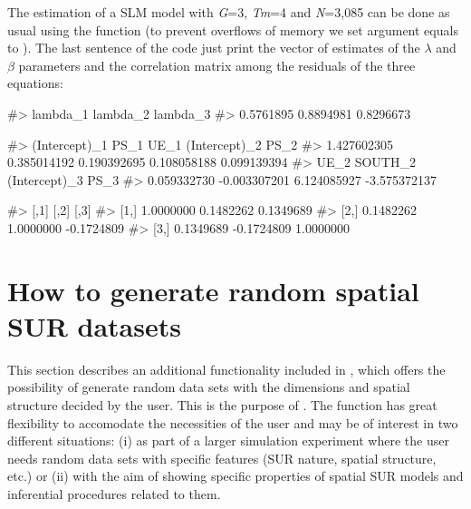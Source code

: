 \documentclass[article]{jss}
\begin{document}
The estimation of a SLM model with \emph{G}=3, \emph{Tm}=4 and \emph{N}=3,085 can be done as usual using the  function (to prevent overflows of memory we set  argument equals to ). The last sentence of the code just print the vector of estimates of the \(\lambda\) and \(\beta\) parameters and the correlation matrix among the residuals of the three equations:

\begin{CodeChunk}


\begin{CodeOutput}
#>  lambda_1  lambda_2  lambda_3 
#> 0.5761895 0.8894981 0.8296673
\end{CodeOutput}

\begin{CodeOutput}
#> (Intercept)_1          PS_1          UE_1 (Intercept)_2          PS_2 
#>   1.427602305   0.385014192   0.190392695   0.108058188   0.099139394 
#>          UE_2       SOUTH_2 (Intercept)_3          PS_3 
#>   0.059332730  -0.003307201   6.124085927  -3.575372137
\end{CodeOutput}

\begin{CodeOutput}
#>           [,1]       [,2]       [,3]
#> [1,] 1.0000000  0.1482262  0.1349689
#> [2,] 0.1482262  1.0000000 -0.1724809
#> [3,] 0.1349689 -0.1724809  1.0000000
\end{CodeOutput}
\end{CodeChunk}

\hypertarget{how-to-generate-random-spatial-sur-datasets}{%
\section{How to generate random spatial SUR datasets}\label{how-to-generate-random-spatial-sur-datasets}}

This section describes an additional functionality included in , which offers the possibility of generate random data sets with the dimensions and spatial structure decided by the user. This is the purpose of . The function has great flexibility to accomodate the necessities of the user and may be of interest in two different situations: (i) as part of a larger simulation experiment where the user needs random data sets with specific features (SUR nature, spatial structure, etc.) or (ii) with the aim of showing specific properties of spatial SUR models and inferential procedures related to them.
\end{document}
